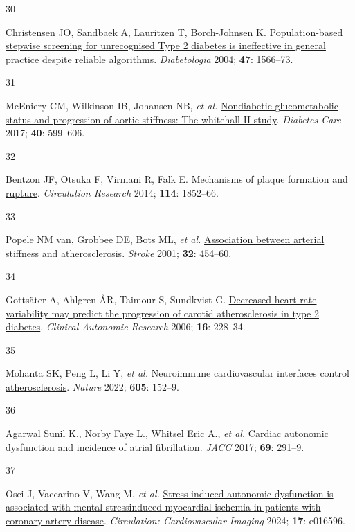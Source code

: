 \documentclass[
  a4paper,
  headsepline=true,
  open=any]{scrbook}
\newlength{\cslhangindent}
\newlength{\csllabelwidth}
\newlength{\cslentryspacingunit} %
\newenvironment{CSLReferences}[2] %
 {%
  \setlength{\parindent}{0pt}
  \ifodd #1
  \let\oldpar\par
  \def\par{\hangindent=\cslhangindent\oldpar}
  \fi
  \setlength{\parskip}{#2\cslentryspacingunit}
 }%
 {}
\newcommand{\CSLLeftMargin}[1]{\parbox[t]{\csllabelwidth}{#1}}
\newcommand{\CSLRightInline}[1]{\parbox[t]{\linewidth - \csllabelwidth}{#1}\break}
\begin{document}
\begin{CSLReferences}{0}{0}
\leavevmode{}%
\CSLLeftMargin{30 }%
\CSLRightInline{Christensen JO, Sandbaek A, Lauritzen T, Borch-Johnsen
K. \href{https://doi.org/10.1007/s00125-004-1496-2}{Population-based
stepwise screening for unrecognised Type 2 diabetes is ineffective in
general practice despite reliable algorithms}. \emph{Diabetologia} 2004;
\textbf{47}: 1566--73.}

\leavevmode{}%
\CSLLeftMargin{31 }%
\CSLRightInline{McEniery CM, Wilkinson IB, Johansen NB, \emph{et al.}
\href{https://doi.org/10.2337/dc16-1773}{Nondiabetic glucometabolic
status and progression of aortic stiffness: The whitehall II study}.
\emph{Diabetes Care} 2017; \textbf{40}: 599--606.}

\leavevmode{}%
\CSLLeftMargin{32 }%
\CSLRightInline{Bentzon JF, Otsuka F, Virmani R, Falk E.
\href{https://doi.org/10.1161/CIRCRESAHA.114.302721}{Mechanisms of
plaque formation and rupture}. \emph{Circulation Research} 2014;
\textbf{114}: 1852--66.}

\leavevmode{}%
\CSLLeftMargin{33 }%
\CSLRightInline{Popele NM van, Grobbee DE, Bots ML, \emph{et al.}
\href{https://doi.org/10.1161/01.STR.32.2.454}{Association between
arterial stiffness and atherosclerosis}. \emph{Stroke} 2001;
\textbf{32}: 454--60.}

\leavevmode{}%
\CSLLeftMargin{34 }%
\CSLRightInline{Gottsäter A, Ahlgren ÅR, Taimour S, Sundkvist G.
\href{https://doi.org/10.1007/s10286-006-0345-4}{Decreased heart rate
variability may predict the progression of carotid atherosclerosis in
type 2 diabetes}. \emph{Clinical Autonomic Research} 2006; \textbf{16}:
228--34.}

\leavevmode{}%
\CSLLeftMargin{35 }%
\CSLRightInline{Mohanta SK, Peng L, Li Y, \emph{et al.}
\href{https://doi.org/10.1038/s41586-022-04673-6}{Neuroimmune
cardiovascular interfaces control atherosclerosis}. \emph{Nature} 2022;
\textbf{605}: 152--9.}

\leavevmode{}%
\CSLLeftMargin{36 }%
\CSLRightInline{Agarwal Sunil K., Norby Faye L., Whitsel Eric A.,
\emph{et al.} \href{https://doi.org/10.1016/j.jacc.2016.10.059}{Cardiac
autonomic dysfunction and incidence of atrial fibrillation}. \emph{JACC}
2017; \textbf{69}: 291--9.}

\leavevmode{}%
\CSLLeftMargin{37 }%
\CSLRightInline{Osei J, Vaccarino V, Wang M, \emph{et al.}
\href{https://doi.org/10.1161/CIRCIMAGING.124.016596}{Stress-induced
autonomic dysfunction is associated with mental
stress{\textendash}induced myocardial ischemia in patients with coronary
artery disease}. \emph{Circulation: Cardiovascular Imaging} 2024;
\textbf{17}: e016596.}


\end{CSLReferences}
\end{document}
